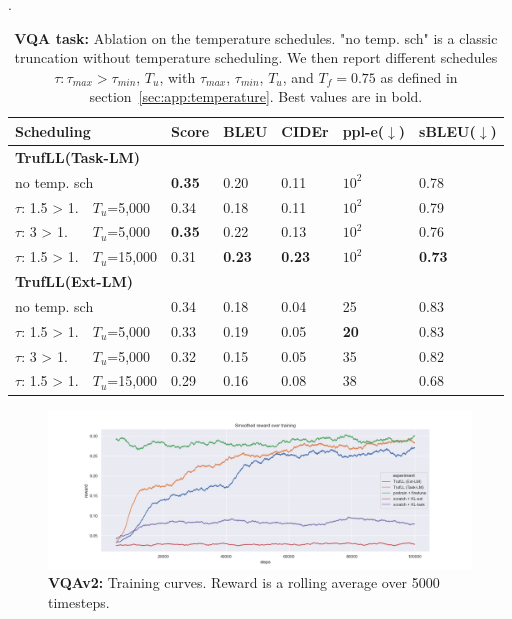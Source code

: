 \documentclass{article}
\newcommand{\algo}{TrufLL\xspace}
\begin{document}
\begin{table}[h!]
\caption{\small \textbf{VQA task:} Ablation on the temperature schedules. "no temp. sch" is a classic truncation without temperature scheduling. We then report different schedules $\tau:\tau_{max}>\tau_{min}$, $T_{u}$, with  $\tau_{max}$, $\tau_{min}$, $T_{u}$, and $T_{f}=0.75$ as defined in section~\ref{sec:app:temperature}. Best values are in bold.
}.
\label{app:table:abl:VQA_temp_schedules}
\centering\hspace*{-0.8cm}
\small
\begin{tabular}{p{}p{}|p{}|p{}p{}p{}|p{}}
\multicolumn{2}{l}{Scheduling}& Score & BLEU & CIDEr
& ppl-e($\downarrow$) & sBLEU($\downarrow$) \\\toprule
\multicolumn{4}{l}{\textbf{\algo(Task-LM)}} \\
\hline
\multicolumn{2}{l|}{no temp. sch} & \textbf{0.35} & 0.20 & 0.11 & $10^2$ & 0.78 \\
$\tau$: 1.5 > 1. &$T_{u}$=5,000  & 0.34 &  0.18 & 0.11 & $10^2$ & 0.79 \\
$\tau$: 3 > 1. & $T_{u}$=5,000 & \textbf{0.35} & 0.22 & 0.13 & $10^2$ & 0.76 \\
$\tau$: 1.5 > 1. & $T_{u}$=15,000 & 0.31 & \textbf{0.23} &  \textbf{0.23} & $10^2$ & \textbf{0.73} \\
\toprule
\multicolumn{4}{l}{\textbf{\algo(Ext-LM)}} \\
\hline
\multicolumn{2}{l|}{no temp. sch} & 0.34 & 0.18 & 0.04 & 25 & 0.83 \\
$\tau$: 1.5 > 1. &$T_{u}$=5,000 & 0.33 & 0.19 &  0.05 & \textbf{20} & 0.83  \\
$\tau$: 3 > 1. & $T_{u}$=5,000 & 0.32 &  0.15 &  0.05 &  35 & 0.82 \\
$\tau$: 1.5 > 1. & $T_{u}$=15,000 & 0.29 &  0.16 &  0.08 & 38 & 0.68 \\
\bottomrule
\end{tabular}
\end{table}

\begin{figure}[h]
    \centering
    \includegraphics[width=\textwidth]{./vqa_train_.png}
    \caption{\textbf{VQAv2:} Training curves. Reward is a rolling average over 5000 timesteps.}
    \label{fig:vqa_training_1}
\end{figure}
\end{document}
